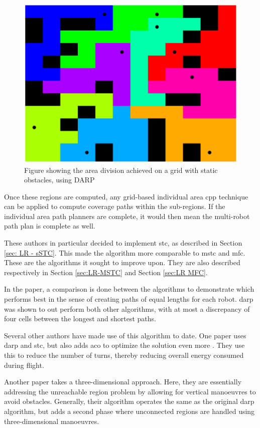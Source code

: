 \begin{figure}[h!]
	\centering
	\includegraphics[scale=0.3]{figs/DARP}
	\caption{Figure showing the area division achieved on a grid with static obstacles, using DARP \cite{DARP2017}}
	\label{fig:DARP_Paper}
\end{figure}

Once these regions are computed, any grid-based individual area \ac{cpp} technique can be applied to compute coverage paths within the sub-regions. If the individual area path planners are complete, it would then mean the multi-robot path plan is complete as well.

These authors in particular decided to implement \acf{stc}, as described in Section \ref{sec: LR - sSTC}. This made the algorithm more comparable to \ac{mstc} and \ac{mfc}. These are the algorithms it sought to improve upon. They are also described respectively in Section \ref{sec:LR-MSTC} and Section \ref{sec:LR MFC}.

In the paper, a comparison is done between the algorithms to demonstrate which performs best in the sense of creating paths of equal lengths for each robot. \ac{darp} was shown to out perform both other algorithms, with at most a discrepancy of four cells between the longest and shortest paths.

Several other authors have made use of this algorithm to date. One paper uses \ac{darp} and \ac{stc}, but also adds \acl{aco} to optimize the solution even more \cite{Gao2018}. They use this to reduce the number of turns, thereby reducing overall energy consumed during flight.

Another paper takes a three-dimensional approach. Here, they are essentially addressing the unreachable region problem by allowing for vertical manoeuvres to avoid obstacles. Generally, their algorithm operates the same as the original \ac{darp} algorithm, but adds a second phase where unconnected regions are handled using three-dimensional manoeuvres. \cite{Baras2019}

